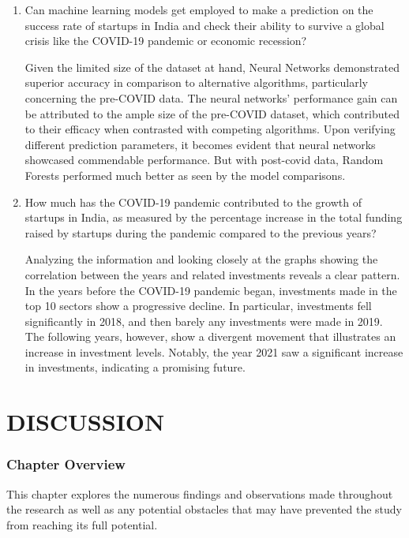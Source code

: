 \documentclass[12pt]{article}
\begin{document}
\begin{enumerate}
    \item Can machine learning models get employed to make a prediction on the success rate of startups in India and check their ability to survive a global crisis like the COVID-19 pandemic or economic recession? 

    Given the limited size of the dataset at hand, Neural Networks demonstrated superior accuracy in comparison to alternative algorithms, particularly concerning the pre-COVID data. The neural networks' performance gain can be attributed to the ample size of the pre-COVID dataset, which contributed to their efficacy when contrasted with competing algorithms. Upon verifying different prediction parameters, it becomes evident that neural networks showcased commendable performance. But with post-covid data, Random Forests performed much better as seen by the model comparisons.

    \item How much has the COVID-19 pandemic contributed to the growth of startups in India, as measured by the percentage increase in the total funding raised by startups during the pandemic compared to the previous years?

    Analyzing the information and looking closely at the graphs showing the correlation between the years and related investments reveals a clear pattern. In the years before the COVID-19 pandemic began, investments made in the top 10 sectors show a progressive decline. In particular, investments fell significantly in 2018, and then barely any investments were made in 2019. The following years, however, show a divergent movement that illustrates an increase in investment levels. Notably, the year 2021 saw a significant increase in investments, indicating a promising future.
    
\end{enumerate}

\newpage
\section{DISCUSSION}
\subsubsection{Chapter Overview}

This chapter explores the numerous findings and observations made throughout the research as well as any potential obstacles that may have prevented the study from reaching its full potential.
\end{document}
